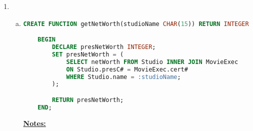 \documentclass[12pt]{article}
\begin{document}
\begin{enumerate}[1.]
\begin{enumerate}[a)]
\begin{lstlisting}[language=c]
                printf("Enter correct launched date (YYYY-MM-DD, Press enter to skip):\n");
                fgets(dateLaunched, sizeof(dateLaunched), stdin);

                if (dateLaunched[0] != '\n') {
                    // Correct date of launch
                    EXEC SQL UPDATE Ships
                             SET launched = newDateLaunched
                             WHERE name=:shipName AND
                                   class=:class AND
                                   launched=:dateLaunched;
                }

                printf("Enter correct battle date (YYYY-MM-DD, Press enter to skip):\n");
                fgets(dateBattle, sizeof(dateBattle),stdin);

                if (dateBattle[0] != '\n') {
                    // Correct date of battle
                    EXEC SQL UPDATE Battles
                             SET date = newDateBattle
                             WHERE name=:battle AND
                                   date=dateBattle;
                }
            }
        EXEC SQL CLOSE execCursor;

    }
    \end{lstlisting}

    \end{enumerate}

    \item

    \begin{enumerate}[a)]

        \item

        \bigskip

    \begin{lstlisting}[language=SQL]
    CREATE FUNCTION getNetWorth(studioName CHAR(15)) RETURN INTEGER

    BEGIN
        DECLARE presNetWorth INTEGER;
        SET presNetWorth = (
            SELECT netWorth FROM Studio INNER JOIN MovieExec
            ON Studio.presC# = MovieExec.cert#
            WHERE Studio.name = :studioName;
        );

        RETURN presNetWorth;
    END;
    \end{lstlisting}

        \bigskip

        \underline{\textbf{Notes:}}

        \bigskip


\end{enumerate}
\end{enumerate}
\end{document}
